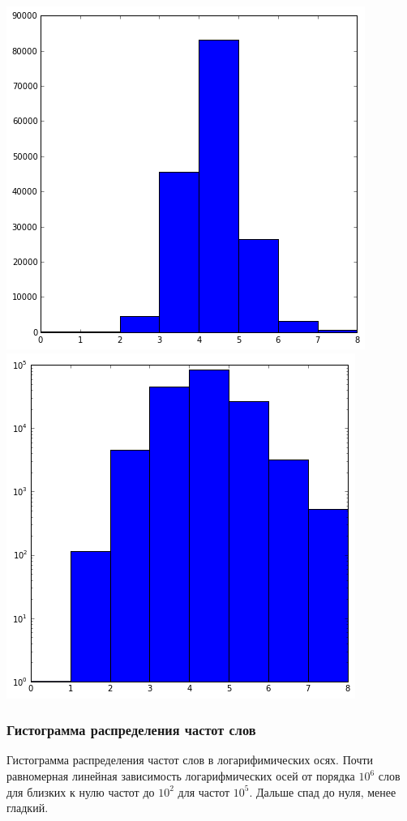 \documentclass[12pt]{article}
\begin{document}
\includegraphics[scale=0.7]{3.png}
\includegraphics[scale=0.7]{4.png}

\subsubsection*{Гистограмма распределения частот слов}
Гистограмма распределения частот слов в логарифимических осях. Почти равномерная линейная зависимость логарифмических осей от порядка $10^6$ слов для близких к нулю частот до $10^2$ для частот $10^5$. Дальше спад до нуля, менее гладкий.
\end{document}
